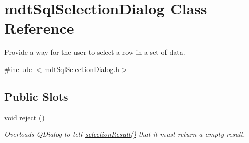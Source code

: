 \hypertarget{classmdt_sql_selection_dialog}{
\section{mdtSqlSelectionDialog Class Reference}
\label{classmdt_sql_selection_dialog}
}


Provide a way for the user to select a row in a set of data.  




{\ttfamily \#include $<$mdtSqlSelectionDialog.h$>$}

\subsection*{Public Slots}
\begin{DoxyCompactItemize}
\item 
\hypertarget{classmdt_sql_selection_dialog_a4277a8f432ee3470039311f9dda9c26d}{
void \hyperlink{classmdt_sql_selection_dialog_a4277a8f432ee3470039311f9dda9c26d}{reject} ()}
\label{classmdt_sql_selection_dialog_a4277a8f432ee3470039311f9dda9c26d}

\begin{DoxyCompactList}\small\item\em Overloads QDialog to tell \hyperlink{classmdt_sql_selection_dialog_a23592c799f3b8945b3f5e72082dc265b}{selectionResult()} that it must return a empty result. \end{DoxyCompactList}\end{DoxyCompactItemize}
